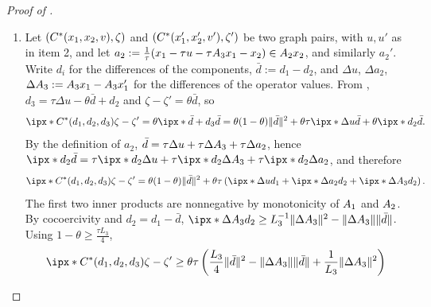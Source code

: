 \documentclass[11pt]{article}
\begin{document}
\begin{proof}[Proof of ]
\begin{enumerate}
            With $\gamma = 1$ and $(x_1,x_2,u) = (x_k,y_k,u_k)$, the terminal test $\norm{\zeta}\leq\delta$ of  is line 5, its relative error test is line 7, and its update $w_{k+1} = w_k - \zeta$ is line 8.
            Line 4 computes the remaining components of the graph pair from $(x_k,u_k)$, so improving $(x_k,u_k)$ and recomputing $y_k$ is the improvement step of , and the residual $x_k + \tau u_k - w_k$ depends only on the output of the $\Acal_1$-solver.
            Since  is a function of $(x_1,u)$, starting the $\Acal_1$-solver at the previously accepted $(x_{k-1},u_{k-1})$ reproduces the previously accepted graph pair.
        \item Let $({C}^*(x_1,x_2,v),\zeta)$ and $({C}^*(x_1',x_2',v'),\zeta')$ be two graph pairs, with $u,u'$ as in item 2, and let $a_2 := \frac{1}{\tau}(x_1 - \tau u - \tau{A}_3 x_1 - x_2)\in{A}_2 x_2$, and similarly $a_2'$.
            Write $d_i$ for the differences of the components, $\bar d := d_1 - d_2$, and $\Delta u$, $\Delta a_2$, $\Delta{A}_3 := {A}_3 x_1 - {A}_3 x_1'$ for the differences of the operator values.
            From , $d_3 = \tau\Delta u - \theta \bar d + d_2$ and $\zeta - \zeta' = \theta \bar d$, so
            \begin{align}
                \ip{\Ccal^*(d_1,d_2,d_3)}{\zeta - \zeta'} = \theta\ip{\bar d + d_3}{\bar d} = \theta(1-\theta)\norm{\bar d}^2 + \theta\tau\ip{\Delta u}{\bar d} + \theta\ip{d_2}{\bar d}.
            \end{align}
            By the definition of $a_2$, $\bar d = \tau\Delta u + \tau\Delta{A}_3 + \tau\Delta a_2$, hence $\ip{d_2}{\bar d} = \tau\ip{d_2}{\Delta u} + \tau\ip{d_2}{\Delta\Acal_3} + \tau\ip{d_2}{\Delta a_2}$, and therefore
            \begin{align}
                \ip{\Ccal^*(d_1,d_2,d_3)}{\zeta - \zeta'} = \theta(1-\theta)\norm{\bar d}^2 + \theta\tau\left(\ip{\Delta u}{d_1} + \ip{\Delta a_2}{d_2} + \ip{\Delta\Acal_3}{d_2}\right).
            \end{align}
            The first two inner products are nonnegative by monotonicity of $\Acal_1$ and ${A}_2$.
            By cocoercivity and $d_2 = d_1 - \bar d$, $\ip{\Delta\Acal_3}{d_2}\geq L_3^{-1}\norm{\Delta\Acal_3}^2 - \norm{\Delta\Acal_3}\norm{\bar d}$.
            Using $1-\theta \geq \frac{\tau L_3}{4}$,
            \begin{align}
                \ip{\Ccal^*(d_1,d_2,d_3)}{\zeta - \zeta'} &\geq \theta\tau\left( \frac{L_3}{4}\norm{\bar d}^2 - \norm{\Delta\Acal_3}\norm{\bar d} + \frac{1}{L_3}\norm{\Delta\Acal_3}^2 \right) \\

\end{align}
\end{enumerate}
\end{proof}
\end{document}

